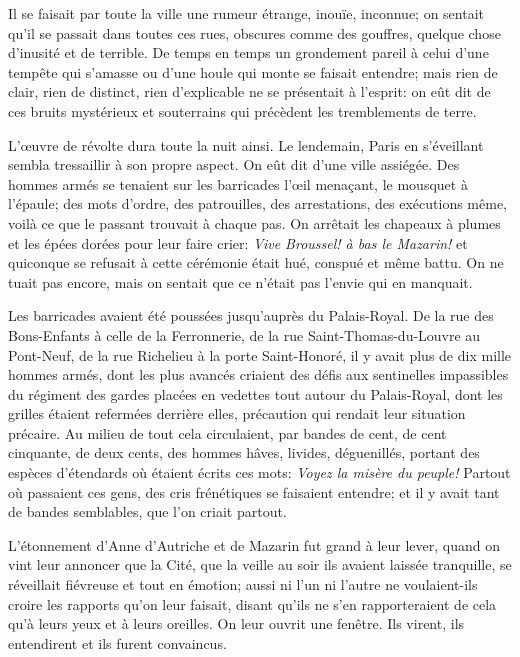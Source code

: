 Il se faisait par toute la ville une rumeur étrange, inouïe, inconnue; on sentait qu'il se passait dans toutes ces rues, obscures comme des gouffres, quelque chose d'inusité et de terrible. De temps en temps un grondement pareil à celui d'une tempête qui s'amasse ou d'une houle qui monte se faisait entendre; mais rien de clair, rien de distinct, rien d'explicable ne se présentait à l'esprit: on eût dit de ces bruits mystérieux et souterrains qui précèdent les tremblements de terre.

L'œuvre de révolte dura toute la nuit ainsi. Le lendemain, Paris en s'éveillant sembla tressaillir à son propre aspect. On eût dit d'une ville assiégée. Des hommes armés se tenaient sur les barricades l'œil menaçant, le mousquet à l'épaule; des mots d'ordre, des patrouilles, des arrestations, des exécutions même, voilà ce que le passant trouvait à chaque pas. On arrêtait les chapeaux à plumes et les épées dorées pour leur faire crier: \textit{Vive Broussel! à bas le Mazarin!} et quiconque se refusait à cette cérémonie était hué, conspué et même battu. On ne tuait pas encore, mais on sentait que ce n'était pas l'envie qui en manquait.

Les barricades avaient été poussées jusqu'auprès du Palais-Royal. De la rue des Bons-Enfants à celle de la Ferronnerie, de la rue Saint-Thomas-du-Louvre au Pont-Neuf, de la rue Richelieu à la porte Saint-Honoré, il y avait plus de dix mille hommes armés, dont les plus avancés criaient des défis aux sentinelles impassibles du régiment des gardes placées en vedettes tout autour du Palais-Royal, dont les grilles étaient refermées derrière elles, précaution qui rendait leur situation précaire. Au milieu de tout cela circulaient, par bandes de cent, de cent cinquante, de deux cents, des hommes hâves, livides, déguenillés, portant des espèces d'étendards où étaient écrits ces mots:\textit{ Voyez la misère du peuple!} Partout où passaient ces gens, des cris frénétiques se faisaient entendre; et il y avait tant de bandes semblables, que l'on criait partout.

L'étonnement d'Anne d'Autriche et de Mazarin fut grand à leur lever, quand on vint leur annoncer que la Cité, que la veille au soir ils avaient laissée tranquille, se réveillait fiévreuse et tout en émotion; aussi ni l'un ni l'autre ne voulaient-ils croire les rapports qu'on leur faisait, disant qu'ils ne s'en rapporteraient de cela qu'à leurs yeux et à leurs oreilles. On leur ouvrit une fenêtre. Ils virent, ils entendirent et ils furent convaincus.

